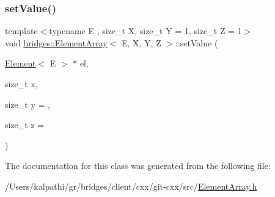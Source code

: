 \hypertarget{classbridges_1_1_element_array_a202def849cd345d8b56ebcb31f332d25}{}\label{classbridges_1_1_element_array_a202def849cd345d8b56ebcb31f332d25} 
\subsubsection{\texorpdfstring{set\+Value()}{setValue()}}
{\footnotesize\ttfamily template$<$typename E , size\+\_\+t X, size\+\_\+t Y = 1, size\+\_\+t Z = 1$>$ \\
void \hyperlink{classbridges_1_1_element_array}{bridges\+::\+Element\+Array}$<$ E, X, Y, Z $>$\+::set\+Value (\begin{DoxyParamCaption}\item[{\hyperlink{classbridges_1_1_element}{Element}$<$ E $>$ $\ast$}]{el,  }\item[{size\+\_\+t}]{x,  }\item[{size\+\_\+t}]{y = {},  }\item[{size\+\_\+t}]{z = {} }\end{DoxyParamCaption})\hspace{0.3cm}{\ttfamily [inline]}}



The documentation for this class was generated from the following file\+:\begin{DoxyCompactItemize}
\item 
/\+Users/kalpathi/gr/bridges/client/cxx/git-\/cxx/src/\hyperlink{_element_array_8h}{Element\+Array.\+h}\end{DoxyCompactItemize}
